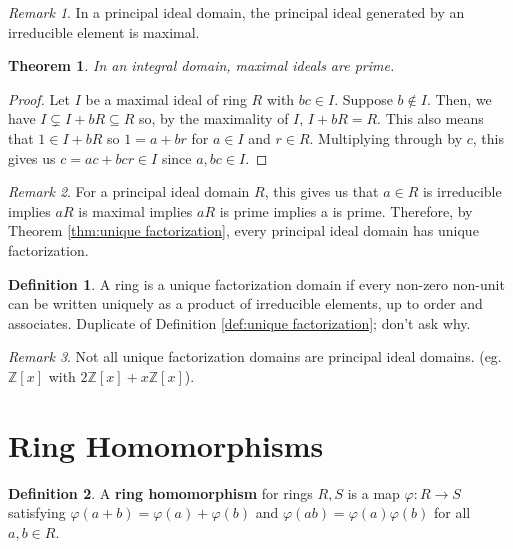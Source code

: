 \documentclass[
    parskip=half,
    toc=flat,
    toc=sectionentrydotfill,
]{scrartcl}  %
\theoremstyle{definition}
\newtheorem{definition}{Definition}[section]
\theoremstyle{plain}
\newtheorem{theorem}{Theorem}[definition]
\theoremstyle{remark}
\newtheorem{remark}{Remark}[definition]
\begin{document}
\begin{remark}
    In a principal ideal domain, the principal ideal generated by an
    irreducible element is maximal.
\end{remark}

\begin{theorem}
    In an integral domain, maximal ideals are prime.
\end{theorem}

\begin{proof}
    Let $I$ be a maximal ideal of ring $R$ with $bc\in I$.
    Suppose $b\notin I$.
    Then, we have $I\subsetneq I+bR\subseteq R$ so, by the maximality of $I$,
    $I+bR=R$.
    This also means that $1\in I+bR$ so $1=a+br$ for $a\in I$ and $r\in R$.
    Multiplying through by $c$, this gives us $c=ac+bcr\in I$ since $a,bc\in I$.
\end{proof}

\begin{remark}
    For a principal ideal domain $R$, this gives us that $a\in R$ is
    irreducible implies $aR$ is maximal implies $aR$ is prime implies a is prime.
    Therefore, by Theorem \ref{thm:unique factorization}, every principal ideal
    domain has unique factorization.
\end{remark}

\begin{definition}
    A ring is a unique factorization domain if every non-zero non-unit can be
    written uniquely as a product of irreducible elements, up to order and
    associates.
    Duplicate of Definition \ref{def:unique factorization}; don't ask why.
\end{definition}

\begin{remark}
    Not all unique factorization domains are principal ideal domains.
    (eg. $\mathbb{Z}[x]$ with $2\mathbb{Z}[x]+x\mathbb{Z}[x]$).
\end{remark}


\section{Ring Homomorphisms}


\begin{definition}
    A \textbf{ring homomorphism} for rings $R,S$ is a map $\varphi:R\to S$
    satisfying $\varphi(a+b)=\varphi(a)+\varphi(b)$ and
    $\varphi(ab)=\varphi(a)\varphi(b)$ for all $a,b\in R$.
\end{definition}
\end{document}
